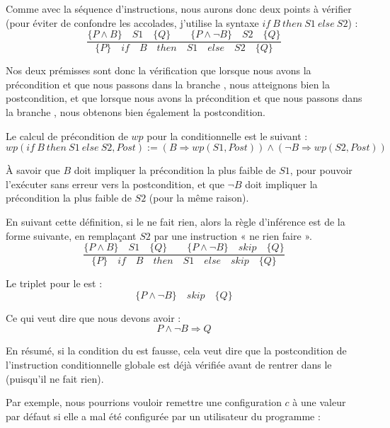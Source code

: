 Comme avec la séquence d'instructions, nous aurons donc deux points à vérifier
(pour éviter de confondre les accolades, j'utilise la syntaxe 
$if\ B\ then\ S1\ else\ S2$) :
$$\dfrac{\{P \wedge B\}\quad S1\quad \{Q\} \quad \quad \{P \wedge \neg B\}\quad S2\quad \{Q\}}{\{P\}\quad if\quad B\quad then\quad S1\quad else\quad S2 \quad \{Q\}}$$



Nos deux prémisses sont donc la vérification que lorsque nous avons la 
précondition et que nous passons dans la branche , nous atteignons bien la
postcondition, et que lorsque nous avons la précondition et que nous passons
dans la branche , nous obtenons bien également la postcondition.



Le calcul de précondition de $wp$ pour la conditionnelle est le suivant :
$$wp(if\ B\ then\ S1\ else\ S2 , Post) := (B \Rightarrow wp(S1, Post)) \wedge (\neg B \Rightarrow wp(S2, Post))$$


À savoir que $B$ doit impliquer la précondition la plus faible de $S1$, pour 
pouvoir l'exécuter sans erreur vers la postcondition, et que $\neg B$ doit 
impliquer la précondition la plus faible de $S2$ (pour la même raison).





En suivant cette définition, si le  ne fait rien, alors la règle
d'inférence est de la forme suivante, en remplaçant $S2$ par une instruction
« ne rien faire ».
$$\dfrac{\{P \wedge B\}\quad S1\quad \{Q\} \quad \quad \{P \wedge \neg B\}\quad skip\quad \{Q\}}{\{P\}\quad if\quad B\quad then\quad S1\quad else\quad skip \quad \{Q\}}$$



Le triplet pour le  est :
$$\{P \wedge \neg B\}\quad skip\quad \{Q\}$$



Ce qui veut dire que nous devons avoir :
$$P \wedge \neg B \Rightarrow Q$$



En résumé, si la condition du  est fausse, cela veut dire que la 
postcondition de l'instruction conditionnelle globale est déjà vérifiée avant de 
rentrer dans le  (puisqu'il ne fait rien).



Par exemple, nous pourrions vouloir remettre une configuration $c$ à une valeur 
par défaut si elle a mal été configurée par un utilisateur du programme :



